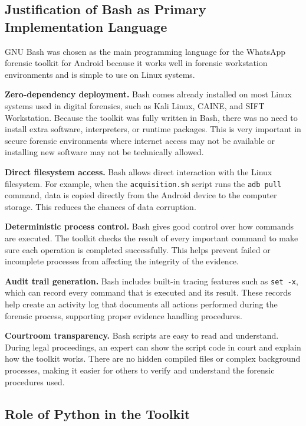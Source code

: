 \documentclass[12pt,a4paper]{report}
\begin{document}
\subsection{Justification of Bash as Primary Implementation Language}

GNU Bash was chosen as the main programming language for the WhatsApp forensic toolkit for Android because it works well in forensic workstation environments and is simple to use on Linux systems.

\textbf{Zero-dependency deployment.}
Bash comes already installed on most Linux systems used in digital forensics, such as Kali Linux, CAINE, and SIFT Workstation. Because the toolkit was fully written in Bash, there was no need to install extra software, interpreters, or runtime packages. This is very important in secure forensic environments where internet access may not be available or installing new software may not be technically allowed.

\textbf{Direct filesystem access.}
Bash allows direct interaction with the Linux filesystem. For example, when the \texttt{acquisition.sh} script runs the \texttt{adb pull} command, data is copied directly from the Android device to the computer storage. This reduces the chances of data corruption.

\textbf{Deterministic process control.}
Bash gives good control over how commands are executed. The toolkit checks the result of every important command to make sure each operation is completed successfully. This helps prevent failed or incomplete processes from affecting the integrity of the evidence.

\textbf{Audit trail generation.}
Bash includes built-in tracing features such as \texttt{set -x}, which can record every command that is executed and its result. These records help create an activity log that documents all actions performed during the forensic process, supporting proper evidence handling procedures.

\textbf{Courtroom transparency.}
Bash scripts are easy to read and understand. During legal proceedings, an expert can show the script code in court and explain how the toolkit works. There are no hidden compiled files or complex background processes, making it easier for others to verify and understand the forensic procedures used.

\subsection{Role of Python in the Toolkit}
\end{document}
